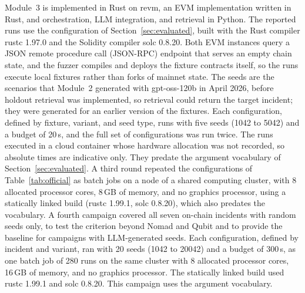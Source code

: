 \documentclass[a4paper]{cas-sc}
\begin{document}
Module~3 is implemented in Rust on revm, an EVM implementation written in Rust, and orchestration, LLM integration, and retrieval in Python. The reported runs use the configuration of Section~\ref{sec:evaluated}, built with the Rust compiler rustc 1.97.0 and the Solidity compiler solc 0.8.20. Both EVM instances query a JSON remote procedure call (JSON-RPC) endpoint that serves an empty chain state, and the fuzzer compiles and deploys the fixture contracts itself, so the runs execute local fixtures rather than forks of mainnet state. The seeds are the scenarios that Module~2 generated with gpt-oss-120b in April 2026, before holdout retrieval was implemented, so retrieval could return the target incident; they were generated for an earlier version of the fixtures. Each configuration, defined by fixture, variant, and seed type, runs with five seeds (1042 to 5042) and a budget of 20\,s, and the full set of configurations was run twice. The runs executed in a cloud container whose hardware allocation was not recorded, so absolute times are indicative only. They predate the argument vocabulary of Section~\ref{sec:evaluated}. A third round repeated the configurations of Table~\ref{tab:official} as batch jobs on a node of a shared computing cluster, with 8 allocated processor cores, 8\,GB of memory, and no graphics processor, using a statically linked build (rustc 1.99.1, solc 0.8.20), which also predates the vocabulary. A fourth campaign covered all seven on-chain incidents with random seeds only, to test the criterion beyond Nomad and Qubit and to provide the baseline for campaigns with LLM-generated seeds. Each configuration, defined by incident and variant, ran with 20 seeds (1042 to 20042) and a budget of 300\,s, as one batch job of 280 runs on the same cluster with 8 allocated processor cores, 16\,GB of memory, and no graphics processor. The statically linked build used rustc 1.99.1 and solc 0.8.20. This campaign uses the argument vocabulary.
\end{document}
